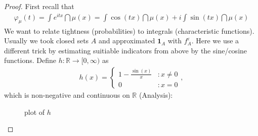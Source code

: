 \begin{proof}[Proof]
				
First recall that						\begin{align*}
	\varphi_{\mu}(t) = \int e^{itx} \dint \mu(x) = \int \cos(tx) \dint \mu(x) + i \int \sin (tx) \dint \mu(x)
\end{align*}
We want to relate tightness (probabilities) to integrals (characteristic functions). Usually we took closed sets $A$ and approximated $\mathbf 1_A$ with $f_A^\varepsilon$. Here we use a different trick by estimating suitiable indicators from above by the sine/cosine functions. Define $h \colon \mathbb{R} \to [0, \infty)$ as 
							\begin{align*}
								h(x) = \begin{cases}
									1 - \frac{\sin(x)}{x} &: x \neq 0 \\
									0 &: x = 0 \end{cases},
							\end{align*}				
						which is non-negative and continuous on $\mathbb{R}$ (Analysis):
\begin{figure}[h]
	\begin{center}
	\caption*{plot of $h$}
\end{center}
\end{figure}						
						
						
						

\end{proof}
